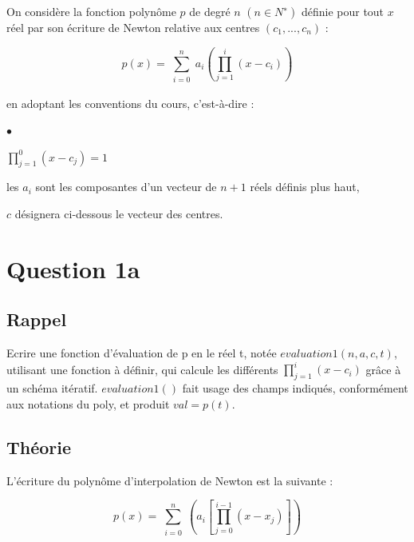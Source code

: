 \documentclass[a4paper,10pt]{report}
\begin{document}
On considère la fonction polynôme $p$ de degré $n$ $(n \in N^{∗} )$ définie pour tout $x$
réel par son écriture de Newton relative aux centres $(c_{1} , ..., c_{n})$ :


\begin{equation}
p(x) = \sum_{\substack{i=0}}^{n} a_{i} \left(\prod_{j=1}^{i}(x-c_{i})\right)
\end{equation}

en adoptant les conventions du cours, c’est-à-dire :
\begin{list}{}{}
\item \begin{list}{$\bullet$}{}
\item $\prod^{0}_{j=1} (x-c_{j}) = 1$
\item les $a_{i}$ sont les composantes d’un vecteur de $n + 1$ réels définis plus haut,
\item $c$ désignera ci-dessous le vecteur des centres.
\end{list}
\end{list}

\section*{Question 1a}

\subsection*{Rappel}

Ecrire une fonction d’évaluation de p en le réel t, notée $evaluation1(n, a, c, t)$, utilisant une fonction à définir, qui calcule les différents $\prod_{j=1}^{i}(x-c_{i})$
grâce à un schéma itératif. $evaluation1()$ fait usage des champs indiqués, conformément aux notations du poly, et produit $val = p(t)$.

\subsection*{Théorie}

L’écriture du polynôme d’interpolation de Newton est la suivante :

\begin{equation}
p(x) = \sum_{\substack{i=0}}^{n} \left(a_{i}\left[\prod_{j=0}^{i-1}(x-x_{j})\right]\right)
\end{equation}
\end{document}
